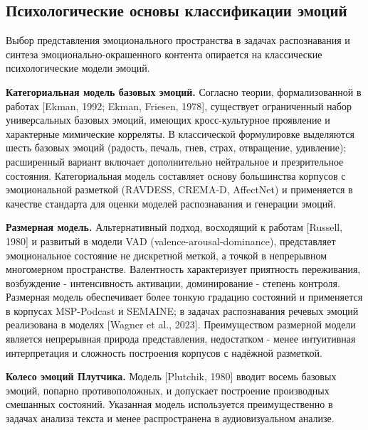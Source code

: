 \documentclass[a4paper, 12pt, oneside, openany]{article}
\begin{document}
\subsection{Психологические основы классификации эмоций}

Выбор представления эмоционального пространства в задачах распознавания и синтеза эмоционально-окрашенного контента опирается на классические психологические модели эмоций.

\textbf{Категориальная модель базовых эмоций.} Согласно теории, формализованной в работах [Ekman, 1992; Ekman, Friesen, 1978], существует ограниченный набор универсальных базовых эмоций, имеющих кросс-культурное проявление и характерные мимические корреляты. В классической формулировке выделяются шесть базовых эмоций (радость, печаль, гнев, страх, отвращение, удивление); расширенный вариант включает дополнительно нейтральное и презрительное состояния. Категориальная модель составляет основу большинства корпусов с эмоциональной разметкой (RAVDESS, CREMA-D, AffectNet) и применяется в качестве стандарта для оценки моделей распознавания и генерации эмоций.

\textbf{Размерная модель.} Альтернативный подход, восходящий к работам [Russell, 1980] и развитый в модели VAD (valence-arousal-dominance), представляет эмоциональное состояние не дискретной меткой, а точкой в непрерывном многомерном пространстве. Валентность характеризует приятность переживания, возбуждение - интенсивность активации, доминирование - степень контроля. Размерная модель обеспечивает более тонкую градацию состояний и применяется в корпусах MSP-Podcast и SEMAINE; в задачах распознавания речевых эмоций реализована в моделях [Wagner et al., 2023]. Преимуществом размерной модели является непрерывная природа представления, недостатком - менее интуитивная интерпретация и сложность построения корпусов с надёжной разметкой.

\textbf{Колесо эмоций Плутчика.} Модель [Plutchik, 1980] вводит восемь базовых эмоций, попарно противоположных, и допускает построение производных смешанных состояний. Указанная модель используется преимущественно в задачах анализа текста и менее распространена в аудиовизуальном анализе.
\end{document}
